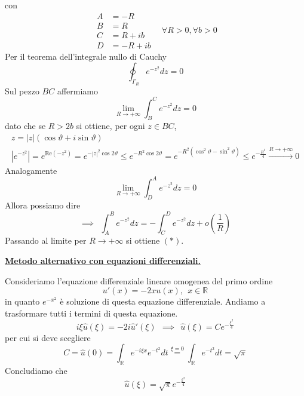 con
\begin{equation*}
\begin{aligned}
A & =-R\\
B & =R\\
C & =R+ib\\
D & =-R+ib
\end{aligned} \ \ \ \ \forall R >0,\forall b >0
\end{equation*}
Per il teorema dell'integrale nullo di Cauchy
\begin{equation*}
\oint _{\Gamma _{R}} e^{-z^{2}} dz=0
\end{equation*}
Sul pezzo $BC$ affermiamo
\begin{equation*}
\lim\limits _{R\rightarrow +\infty }\int ^{C}_{B} e^{-z^{2}} dz=0
\end{equation*}
dato che se $R >2b$ si ottiene, per ogni $z\in BC$,
\begin{gather*}
z=| z| (\cos \vartheta +i\sin \vartheta )\\
\left| e^{-z^{2}}\right| =e^{\mathrm{Re}\left( -z^{2}\right)} =e^{-| z| ^{2}\cos 2\vartheta } \leqslant e^{-R^{2}\cos 2\vartheta } =e^{-R^{2}\left(\cos^{2} \vartheta -\sin^{2} \vartheta \right)} \leqslant e^{-\frac{R^{2}}{4}}\xrightarrow{R\rightarrow +\infty } 0
\end{gather*}
Analogamente
\begin{equation*}
\lim\limits _{R\rightarrow +\infty }\int ^{A}_{D} e^{-z^{2}} dz=0
\end{equation*}
Allora possiamo dire
\begin{equation*}
\implies \ \ \int ^{B}_{A} e^{-z^{2}} dz=-\int ^{D}_{C} e^{-z^{2}} dz+o\left(\frac{1}{R}\right)
\end{equation*}
Passando al limite per $R\rightarrow +\infty $ si ottiene $( *)$.



\underline{\textbf{Metodo alternativo con equazioni differenziali.}}

Consideriamo l'equazione differenziale lineare omogenea del primo ordine
\begin{equation*}
u'( x) =-2xu( x) ,\ \ x\in \mathbb{R}
\end{equation*}
in quanto $e^{-x^{2}}$ è soluzione di questa equazione differenziale. Andiamo a trasformare tutti i termini di questa equazione.
\begin{equation*}
i\xi \hat{u}( \xi ) =-2i\hat{u} '( \xi ) \ \ \implies \ \ \hat{u}( \xi ) =Ce^{-\frac{\xi ^{2}}{4}}
\end{equation*}
per cui si deve scegliere
\begin{equation*}
C=\hat{u}( 0) =\int _{\mathbb{R}} e^{-i\xi x} e^{-t^{2}} dt\overset{\xi =0}{=}\int _{\mathbb{R}} e^{-t^{2}} dt=\sqrt{\pi }
\end{equation*}
Concludiamo che
\begin{equation*}
\boxed{\hat{u}( \xi ) =\sqrt{\pi } e^{-\frac{\xi ^{2}}{4}}}
\end{equation*}
\Soluzione

